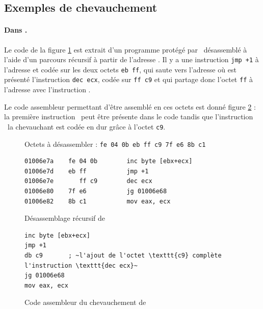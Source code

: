 \subsection{Exemples de chevauchement}

\paragraph{Dans \telock.}
Le code de la figure \ref{fig:telock_obf_disas} est extrait d'un programme protégé par \telock\ désassemblé à l'aide d'un parcours récursif à partir de l'adresse . Il y a une instruction \texttt{jmp +1} à l'adresse  et codée sur les deux octets \texttt{eb ff}, qui saute vers l'adresse  où est présenté l'instruction \texttt{dec ecx}, codée sur \texttt{ff c9} et qui partage donc l'octet \texttt{ff} à l'adresse  avec l'instruction \jmp.

Le code assembleur permettant d'être assemblé en ces octets est donné figure \ref{fig:telock_obf_asm} : la première instruction \jmp\ peut être présente dans le code tandis que l'instruction \dec\ la chevauchant est codée en dur grâce à l'octet \texttt{c9}.

\begin{figure}
Octets à désassembler : \texttt{fe 04 0b eb ff c9 7f e6 8b c1}
\begin{lstlisting}[language={[x86masm]Assembler}, escapechar=~]
01006e7a    fe 04 0b        inc byte [ebx+ecx]
01006e7d    eb ff           jmp +1
01006e7e       ff c9        dec ecx
01006e80    7f e6           jg 01006e68
01006e82    8b c1           mov eax, ecx
\end{lstlisting}
\caption{Désassemblage récursif de \telock}
\label{fig:telock_obf_disas}
\end{figure}

\begin{figure}
\begin{lstlisting}[language={[x86masm]Assembler}, escapechar=~]
inc byte [ebx+ecx]
jmp +1
db c9 		; ~l'ajout de l'octet \texttt{c9} complète l'instruction \texttt{dec ecx}~
jg 01006e68
mov eax, ecx
\end{lstlisting}
\caption{Code assembleur du chevauchement de \telock}
\label{fig:telock_obf_asm}
\end{figure}


